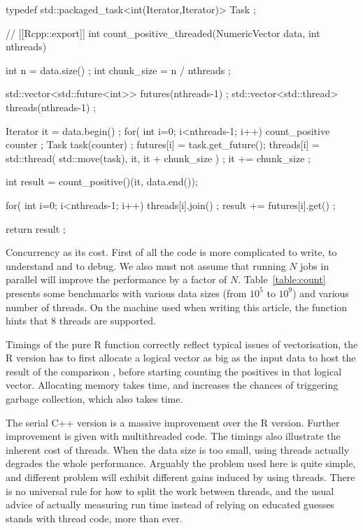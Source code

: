 \begin{example}
typedef std::packaged_task<int(Iterator,Iterator)> Task ;

// [[Rcpp::export]]
int count_positive_threaded(NumericVector data, int nthreads){
  int n = data.size() ;
  int chunk_size = n / nthreads ;

  std::vector<std::future<int>> futures(nthreads-1) ;
  std::vector<std::thread> threads(nthreads-1) ;

  Iterator it = data.begin() ;
  for( int i=0; i<nthreads-1; i++){
    count_positive counter ;
    Task task(counter) ;
    futures[i] = task.get_future();
    threads[i] = std::thread( std::move(task), it, it + chunk_size ) ;
    it += chunk_size ;
  }

  int result = count_positive()(it, data.end());

  for( int i=0; i<nthreads-1; i++){
    threads[i].join() ;
    result += futures[i].get() ;
  }

  return result ;
}
\end{example}

Concurrency as its cost. First of all the code is more complicated
to write, to understand and to debug. We also must not assume that
running $N$ jobs in parallel will improve the performance by a factor
of $N$. Table~\ref{table:count} presents some benchmarks with various
data sizes (from $10^5$ to $ 10^9$) and various number of threads.
On the machine used when writing this article,
the  function hints that 8 threads
are supported.

Timings of the pure R function correctly reflect typical issues of
vectorisation, the R version has to first allocate a logical vector
as big as the input data to host the result of the comparison , before
starting counting the positives in that logical vector. Allocating
memory takes time, and increases the chances of triggering garbage collection,
which also takes time.

The serial C++ version is a massive improvement over the R version. Further
improvement is given with multithreaded code. The timings also illustrate
the inherent cost of threads. When the data size is too small, using threads
actually degrades the whole performance. Arguably the problem used here
is quite simple, and different problem will exhibit different gains
induced by using threads. There is no universal rule for how to split
the work between threads, and the usual advice of actually measuring
run time instead of relying on educated guesses stands with thread code, more than
ever.

